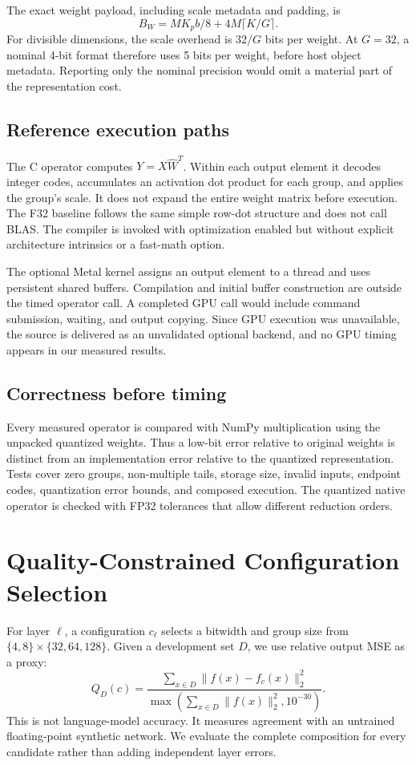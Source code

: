 \documentclass[11pt]{article}
\begin{document}
The exact weight payload, including scale metadata and padding, is
\begin{equation}
B_W=M K_p b/8+4M\lceil K/G\rceil.
\label{eq:bytes}
\end{equation}
For divisible dimensions, the scale overhead is $32/G$ bits per weight. At
$G=32$, a nominal 4-bit format therefore uses 5 bits per weight, before host object
metadata. Reporting only the nominal precision would omit a material part of the
representation cost.

\subsection{Reference execution paths}
The C operator computes $Y=X\widehat W^T$. Within each output element it decodes
integer codes, accumulates an activation dot product for each group, and applies
the group's scale. It does not expand the entire weight matrix before execution.
The F32 baseline follows the same simple row-dot structure and does not call BLAS.
The compiler is invoked with optimization enabled but without explicit
architecture intrinsics or a fast-math option.

The optional Metal kernel assigns an output element to a thread and uses persistent
shared buffers. Compilation and initial buffer construction are outside the timed
operator call. A completed GPU call would include command submission, waiting, and
output copying. Since GPU execution was unavailable, the source is delivered as an
unvalidated optional backend, and no GPU timing appears in our measured results.

\subsection{Correctness before timing}
Every measured operator is compared with NumPy multiplication using the unpacked
quantized weights. Thus a low-bit error relative to original weights is distinct
from an implementation error relative to the quantized representation. Tests cover
zero groups, non-multiple tails, storage size, invalid inputs, endpoint codes,
quantization error bounds, and composed execution. The quantized native operator is
checked with FP32 tolerances that allow different reduction orders.

\section{Quality-Constrained Configuration Selection}
For layer $\ell$, a configuration $c_\ell$ selects a bitwidth and group size from
$\{4,8\}\times\{32,64,128\}$. Given a development set $D$, we use relative output
MSE as a proxy:
\begin{equation}
Q_D(c)=\frac{\sum_{x\in D}\|f(x)-f_c(x)\|_2^2}
{\max(\sum_{x\in D}\|f(x)\|_2^2,10^{-30})}.
\end{equation}
This is not language-model accuracy. It measures agreement with an untrained
floating-point synthetic network. We evaluate the complete composition for every
candidate rather than adding independent layer errors.
\end{document}
